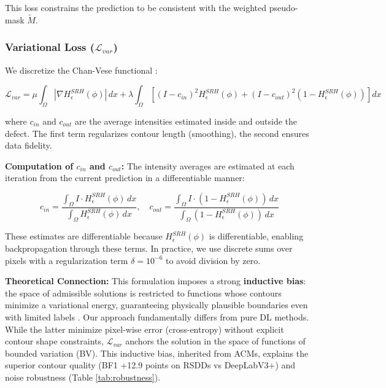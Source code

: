 \documentclass[12pt, a4paper]{article}
\newcommand{\calL}{\mathcal{L}}
\begin{document}
This loss constrains the prediction to be consistent with the weighted pseudo-mask $\tilde{M}$.

\subsubsection{Variational Loss ($\calL_{var}$)}

We discretize the Chan-Vese functional \cite{chan2001active}:

\begin{equation}
\calL_{var} = \mu \int_{\Omega} |\nabla H_\epsilon^{SRH}(\phi)| \, dx + \lambda \int_{\Omega} \left[ (I - c_{in})^2 H_\epsilon^{SRH}(\phi) + (I - c_{out})^2 (1 - H_\epsilon^{SRH}(\phi)) \right] dx
\label{eq:var_loss}
\end{equation}

where $c_{in}$ and $c_{out}$ are the average intensities estimated inside and outside the defect. The first term regularizes contour length (smoothing), the second ensures data fidelity.

\textbf{Computation of $c_{in}$ and $c_{out}$:} The intensity averages are estimated at each iteration from the current prediction in a differentiable manner:

\begin{equation}
c_{in} = \frac{\int_{\Omega} I \cdot H_\epsilon^{SRH}(\phi) \, dx}{\int_{\Omega} H_\epsilon^{SRH}(\phi) \, dx}, \quad
c_{out} = \frac{\int_{\Omega} I \cdot (1 - H_\epsilon^{SRH}(\phi)) \, dx}{\int_{\Omega} (1 - H_\epsilon^{SRH}(\phi)) \, dx}
\label{eq:c_in_out}
\end{equation}

These estimates are differentiable because $H_\epsilon^{SRH}(\phi)$ is differentiable, enabling backpropagation through these terms. In practice, we use discrete sums over pixels with a regularization term $\delta = 10^{-6}$ to avoid division by zero.

\textbf{Theoretical Connection:} This formulation imposes a strong \textbf{inductive bias}: the space of admissible solutions is restricted to functions whose contours minimize a variational energy, guaranteeing physically plausible boundaries even with limited labels \cite{review2025}. Our approach fundamentally differs from pure DL methods. While the latter minimize pixel-wise error (cross-entropy) without explicit contour shape constraints, $\calL_{var}$ anchors the solution in the space of functions of bounded variation (BV). This inductive bias, inherited from ACMs, explains the superior contour quality (BF1 +12.9 points on RSDDs vs DeepLabV3+) and noise robustness (Table \ref{tab:robustness}).
\end{document}
